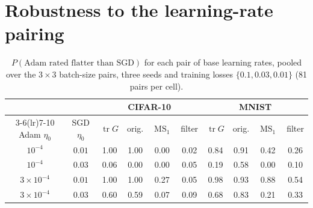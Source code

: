 \documentclass[10pt]{article}
\theoremstyle{remark}
\newcommand{\tr}{\operatorname{tr}}
\newcommand{\MS}{\operatorname{MS}}
\begin{document}
\section{Robustness to the learning-rate pairing}\label{app:lrpairs}
\begin{table}[h]
\centering
\small
\caption{$P(\text{Adam rated flatter than SGD})$ for each pair of base learning rates, pooled over the $3\times3$ batch-size pairs, three seeds and training losses $\{0.1,0.03,0.01\}$ (81 pairs per cell).}
\label{tab:lrpairs}
\begin{tabular}{cc cccc cccc}
\toprule
& & \multicolumn{4}{c}{CIFAR-10} & \multicolumn{4}{c}{MNIST}\\
\cmidrule(lr){3-6}\cmidrule(lr){7-10}
Adam $\eta_0$ & SGD $\eta_0$ & $\tr G$ & orig. & $\MS_1$ & filter & $\tr G$ & orig. & $\MS_1$ & filter\\
\midrule
$10^{-4}$ & $0.01$ & 1.00 & 1.00 & 0.00 & 0.02 & 0.84 & 0.91 & 0.42 & 0.26\\
$10^{-4}$ & $0.03$ & 0.06 & 0.00 & 0.00 & 0.05 & 0.19 & 0.58 & 0.00 & 0.10\\
$3{\times}10^{-4}$ & $0.01$ & 1.00 & 1.00 & 0.27 & 0.05 & 0.98 & 0.93 & 0.88 & 0.54\\
$3{\times}10^{-4}$ & $0.03$ & 0.60 & 0.59 & 0.07 & 0.09 & 0.68 & 0.83 & 0.21 & 0.33\\
\bottomrule
\end{tabular}
\end{table}
\end{document}
